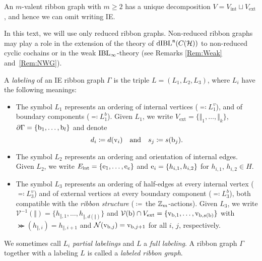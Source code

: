 \documentclass[\MainFolder/Text.tex]{subfiles}
\begin{document}
\begin{Remark}
\begin{RemarkList}
\item An $m$-valent ribbon graph with $m\ge 2$ has a unique decomposition $V = V_{\mathrm{int}}\sqcup V_{\mathrm{ext}}$, and hence we can omit writing IE.
\item In this text, we will use only reduced ribbon graphs. Non-reduced ribbon graphs may play a role in the extension of the theory of $\mathrm{dIBL}^{\mathfrak{n}}(C(\mathcal{H}))$ to non-reduced cyclic cochains  or in the weak $\mathrm{IBL}_\infty$-theory (see Remarks \ref{Rem:Weak} and~\ref{Rem:NWG}).\qedhere
\end{RemarkList}
\end{Remark}

\begin{Def}[Labeling] \label{Def:Labeling}
A \emph{labeling} of an IE ribbon graph $\Gamma$ is the triple $L = (L_1,L_2,L_3)$, where $L_i$ have the following meanings: 
\begin{itemize}
 \item The symbol $L_1$ represents an ordering of internal vertices ($\eqqcolon L_1^v$), and of boundary components ($\eqqcolon L_1^b$). Given $L_1$, we write $V_{\mathrm{ext}} = \{\Vert_1, \dotsc, \Vert_k\}$, $\partial \Gamma = \{\mathrm{b}_1, \dotsc, \mathrm{b}_l\}$ and denote
$$ d_i \coloneqq d(\mathrm{v}_i)\quad\text{and}\quad s_j\coloneqq s(\mathrm{b}_j). $$
 \item The symbol $L_2$ represents an ordering and orientation of internal edges. Given $L_2$, we write $E_{\mathrm{int}} = \{\mathrm{e}_1, \dotsc, \mathrm{e}_e\}$ and $\mathrm{e}_i =\{h_{i,1}, h_{i,2}\}$ for $h_{i,1}$, $h_{i,2}\in H$.
 \item The symbol $L_3$ represents an ordering of half-edges at every internal vertex ($\eqqcolon L_3^v$) and of external vertices at every boundary component ($\eqqcolon L_3^b$), both compatible with the \emph{ribbon structure} ($\coloneqq$\,the $\mathbb{Z}_m$-actions). Given $L_3$, we write $\mathcal{V}^{-1}(\Vert) = \{h_{\Vert,1}, \dotsc,h_{\Vert,d(\Vert)} \}$ and $\mathcal{V}(\mathrm{b}) \cap V_{\mathrm{ext}}= \{\mathrm{v}_{\mathrm{b},1},\dotsc,\mathrm{v}_{\mathrm{b},s(\mathrm{b})}\}$ with $\Succ(h_{\Vert,i}) = h_{\Vert,i+1}$ and $\mathcal{N}(\mathrm{v}_{\mathrm{b},j}) = \mathrm{v}_{\mathrm{b},j+1}$ for all $i$, $j$, respectively. 
\end{itemize}
We sometimes call $L_i$ \emph{partial labelings} and $L$ a \emph{full labeling}. A ribbon graph $\Gamma$ together with a labeling $L$ is called a \emph{labeled ribbon graph}.
\end{Def}
\end{document}
